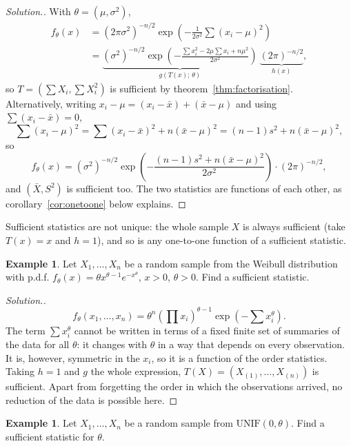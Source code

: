\documentclass[12pt,a4paper]{report}
\theoremstyle{definition}
\newtheorem{exa}[thm]{Example}
\newenvironment{solution}
  {\renewcommand{\qedsymbol}{}\begin{proof}[\textit{Solution}.]}
  {\end{proof}}
\begin{document}
\begin{solution}
With $\theta = (\mu, \sigma^2)$,
\begin{align*}
f_\theta(x) &= (2\pi\sigma^2)^{-n/2}\exp\left(-\frac{1}{2\sigma^2}\sum (x_i - \mu)^2\right)\\
&= \underbrace{(\sigma^2)^{-n/2}\exp\left(-\frac{\sum x_i^2 - 2\mu\sum x_i + n\mu^2}{2\sigma^2}\right)}_{g(T(x);\,\theta)}\ \underbrace{(2\pi)^{-n/2}}_{h(x)},
\end{align*}
so $T = \left(\sum X_i, \sum X_i^2\right)$ is sufficient by
theorem~\ref{thm:factorisation}. Alternatively, writing
$x_i - \mu = (x_i - \bar x) + (\bar x - \mu)$ and using $\sum (x_i - \bar x) = 0$,
\[\sum (x_i - \mu)^2 = \sum (x_i - \bar x)^2 + n(\bar x - \mu)^2 = (n - 1)s^2 + n(\bar x - \mu)^2,\]
so
\[f_\theta(x) = (\sigma^2)^{-n/2}\exp\left(-\frac{(n - 1)s^2 + n(\bar x - \mu)^2}{2\sigma^2}\right)\cdot(2\pi)^{-n/2},\]
and $(\bar X, S^2)$ is sufficient too. The two statistics are functions of each
other, as corollary~\ref{cor:onetoone} below explains.
\end{solution}

Sufficient statistics are not unique: the whole sample $X$ is always sufficient
(take $T(x) = x$ and $h = 1$), and so is any one-to-one function of a sufficient
statistic.

\begin{exa}
\label{ex:weibullsufficient}
Let $X_1, \dots, X_n$ be a random sample from the Weibull distribution with
p.d.f. $f_\theta(x) = \theta x^{\theta - 1}e^{-x^\theta}$, $x>0$, $\theta>0$. Find a
sufficient statistic.
\end{exa}

\begin{solution}
\[f_\theta(x_1, \dots, x_n) = \theta^n\left(\prod x_i\right)^{\theta - 1}\exp\left(-\sum x_i^\theta\right).\]
The term $\sum x_i^\theta$ cannot be written in terms of a fixed finite set of
summaries of the data for all $\theta$: it changes with $\theta$ in a way that
depends on every observation. It is, however, symmetric in the $x_i$, so it is a
function of the order statistics. Taking $h = 1$ and $g$ the whole expression,
$T(X) = (X_{(1)}, \dots, X_{(n)})$ is sufficient. Apart from forgetting the order in
which the observations arrived, no reduction of the data is possible here.
\end{solution}

\begin{exa}
\label{ex:uniformsufficient}
Let $X_1, \dots, X_n$ be a random sample from $\text{UNIF}(0, \theta)$. Find a
sufficient statistic for $\theta$.
\end{exa}
\end{document}
